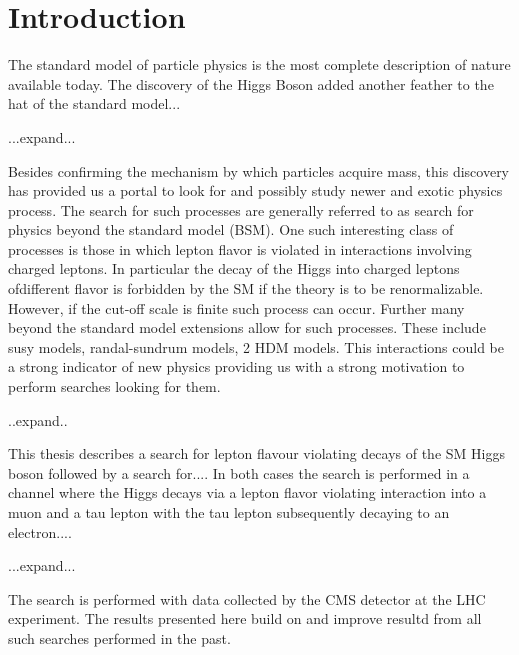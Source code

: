 %
%
%
%
%
%
%
%
%
%


%
%

\chapter{Introduction}


The standard model of particle physics is the most complete description of nature available today. The discovery of the Higgs Boson added another feather to the hat of the standard model...

...expand...

Besides confirming the mechanism by which particles acquire mass, this discovery has provided us a portal to look for and possibly study newer and exotic physics process. The search for such processes are generally referred to as search for physics beyond the standard model (BSM). One such interesting class of processes is those in which lepton flavor is violated in interactions involving charged leptons. In particular the decay of the Higgs into charged leptons ofdifferent flavor is forbidden by the SM if the theory is to be renormalizable. However, if the cut-off scale is finite such process can occur. Further many beyond the standard model extensions allow for such processes. These include susy models, randal-sundrum models, 2 HDM models. This interactions could be a strong indicator of new physics providing us with a strong motivation to perform searches looking for them.


..expand..

This thesis describes a search for lepton flavour violating decays of the SM Higgs boson followed by a search for.... In both cases the search is performed in a channel where the Higgs decays via a lepton flavor violating interaction into a muon and a tau lepton with the tau lepton subsequently decaying to an electron....


...expand...


The search is performed with data collected by the CMS detector at the LHC experiment. The results presented here build on and improve resultd from all such searches performed in the past.







%
% 
% 
